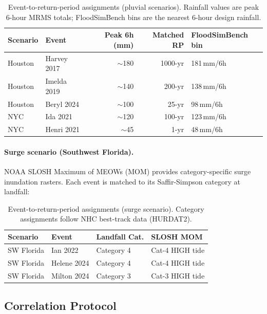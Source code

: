 \begin{table}[h]
\centering
\small
\caption{Event-to-return-period assignments (pluvial scenarios).
  Rainfall values are peak 6-hour MRMS totals; FloodSimBench bins
  are the nearest 6-hour design rainfall.}
\label{tab:event-rp-pluvial}
\begin{tabular}{llrrl}
\toprule
Scenario & Event & Peak 6h (mm) & Matched RP & FloodSimBench bin \\
\midrule
Houston & Harvey 2017    & $\sim$180 & 1000-yr & 181\,mm/6h \\
Houston & Imelda 2019    & $\sim$140 & 200-yr  & 138\,mm/6h \\
Houston & Beryl 2024     & $\sim$100 & 25-yr   & 98\,mm/6h  \\
NYC     & Ida 2021       & $\sim$120 & 100-yr  & 123\,mm/6h \\
NYC     & Henri 2021     & $\sim$45  & 1-yr    & 48\,mm/6h  \\
\bottomrule
\end{tabular}
\end{table}

\paragraph{Surge scenario (Southwest Florida).}
NOAA SLOSH Maximum of MEOWs (MOM) provides category-specific surge
inundation rasters.  Each event is matched to its Saffir-Simpson
category at landfall:

\begin{table}[h]
\centering
\small
\caption{Event-to-return-period assignments (surge scenario).
  Category assignments follow NHC best-track data (HURDAT2).}
\label{tab:event-rp-surge}
\begin{tabular}{llll}
\toprule
Scenario & Event & Landfall Cat. & SLOSH MOM \\
\midrule
SW Florida & Ian 2022    & Category 4 & Cat-4 HIGH tide \\
SW Florida & Helene 2024 & Category 4 & Cat-4 HIGH tide \\
SW Florida & Milton 2024 & Category 3 & Cat-3 HIGH tide \\
\bottomrule
\end{tabular}
\end{table}

\subsection{Correlation Protocol}
\label{app:fast-protocol}

